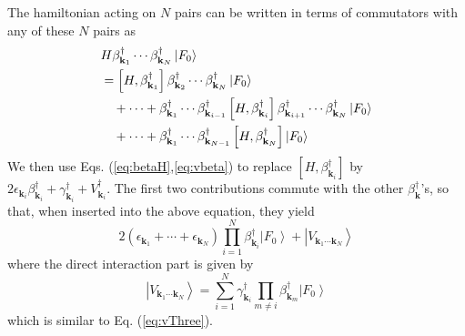 \documentclass[epj]{svjour}
\newcommand{\vk}{\ensuremath{\mathbf{k}}}
\begin{document}
The hamiltonian acting on $N$ pairs can be written in terms of commutators with any of these $N$ pairs as 
\begin{equation}\label{eq:HN}
\begin{split}
&H\beta^{\dagger}_{\mathbf{k} _1}\cdots\beta^{\dagger}_{\mathbf{k}
_N}\left|F_0\right> \\
&=\left[H,\beta^{\dagger}_{\mathbf{k} _1}\right]  \beta^{\dagger}_{%
\mathbf{k} _2}\cdots\beta^{\dagger}_{\mathbf{k} _N}\left|F_0\right> \\
&\quad+\cdots+\beta^{\dagger}_{\mathbf{k} _1}\cdots\beta^{\dagger}_{\mathbf{k} _{i-1}}
\left[H,\beta^{\dagger}_{\mathbf{k} _i}\right]  \beta^{\dagger}_{\mathbf{k}
_{i+1}}\cdots \beta^{\dagger}_{\mathbf{k}_{N}}\left|F_0\right>\\
&\quad+\cdots+\beta^{\dagger}_{\mathbf{k} _1}\cdots\beta^{\dagger}_{\mathbf{k} _{N-1}}
\left[H,\beta^{\dagger}_{\mathbf{k} _N}\right] \left|F_0\right>
\end{split}
\end{equation}
We then use Eqs. (\ref{eq:betaH},\ref{eq:vbeta}) to replace $\left[H,\beta^{\dagger}_{\mathbf{k} _i}\right]$ by $2\epsilon_{\vk_i}\beta^{\dagger}_{\vk_i}+\gamma^{\dagger}_{\vk_i}+V^{\dagger}_{\vk_i}$.  The first two contributions commute with the other $\beta^\dagger_\vk$'s, so that, when inserted into the above equation, they yield
\begin{equation}
2\left(\epsilon_{\mathbf{k} _1}+\cdots+\epsilon_{\mathbf{k} _N}\right)
\prod^N_{i=1}\beta^{\dagger}_{\mathbf{k} _i}\left|F_0\right>+\left|{V}_{\mathbf{k} _1\cdots\mathbf{k} _N}\right> 
\end{equation}
where the direct interaction part is given by 
\begin{equation}  
\left|V_{\mathbf{k} _1\cdots\mathbf{k} _N}\right> =\sum^N_{i=1}\gamma^{\dagger}_{\mathbf{k}_i}\prod_{m\neq{i}}\beta^{\dagger}_{\mathbf{k} _m}\left|F_0\right>   
\end{equation}
which is similar to Eq. (\ref{eq:vThree}). 
\end{document}
